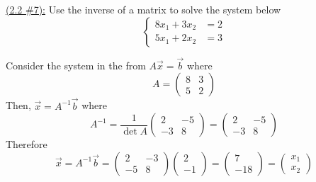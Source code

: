 \documentclass{exam}
\begin{document}
\underline{(2.2 \#7):} Use the inverse of a matrix to solve the system below
\[
    \begin{cases}
        8x_1 + 3x_2 &= 2 \\
        5x_1 + 2x_2 &= 3
    \end{cases}
\]
\begin{solution}
    Consider the system in the from $A\vec{x}=\vec{b}$ where
    \[
        A = \begin{pmatrix}
            8 & 3 \\ 5 & 2
        \end{pmatrix} 
    \]
    Then, $\vec{x}=A^{-1}\vec{b}$ where
    \[
        A^{-1} = \frac{1}{\mathop{\det}A}\begin{pmatrix}
            2 & -5 \\ 
            -3 & 8
        \end{pmatrix} 
        =
        \begin{pmatrix}
            2 & -5 \\
            -3 & 8
        \end{pmatrix}
    \]
    Therefore
    \[
        \vec{x} = A^{-1}\vec{b} = 
        \begin{pmatrix}
            2 & -3 \\
            -5 & 8
        \end{pmatrix}
        \begin{pmatrix}
            2 \\ -1
        \end{pmatrix}
        = 
        \boxed{\begin{pmatrix}
            7 \\ -18
        \end{pmatrix}
        = 
        \begin{pmatrix}
            x_1 \\ x_2
        \end{pmatrix}}
    \]
\end{solution}
\end{document}
